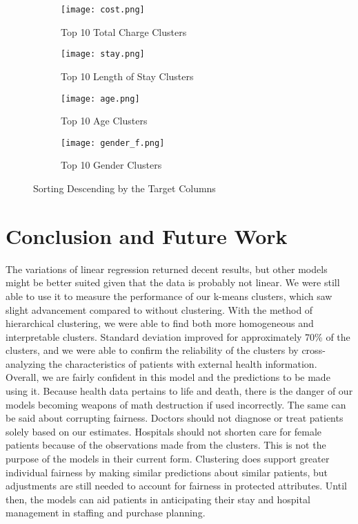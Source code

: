 \documentclass{article}
\begin{document}
\begin{figure}[H]
         \centering
         \centering
     \begin{subfigure}[b]{0.4\textwidth}
         \centering
         \texttt{[image: cost.png]}
         \caption{Top 10 Total Charge Clusters}
         \label{fig:y equals x}
     \end{subfigure}
     \begin{subfigure}[b]{0.4\textwidth}
         \centering
         \texttt{[image: stay.png]}
         \caption{Top 10 Length of Stay Clusters}
         \label{fig:three sin x}
     \end{subfigure}
     \begin{subfigure}[b]{0.4\textwidth}
         \centering
         \texttt{[image: age.png]}
         \caption{Top 10 Age Clusters}
         \label{fig:three sin x}
     \end{subfigure}
     \begin{subfigure}[b]{0.4\textwidth}
         \centering
         \texttt{[image: gender\_f.png]}
         \caption{Top 10 Gender Clusters}
         \label{fig:three sin x}
     \end{subfigure}
     \caption{Sorting Descending by the Target Columns}
\end{figure}
\noindent
\newline

\section{Conclusion and Future Work}
The variations of linear regression returned decent results, but other models might be better suited given that the data is probably not linear. We were still able to use it to measure the performance of our k-means clusters, which saw slight advancement compared to without clustering. With the method of hierarchical clustering, we were able to find both more homogeneous and interpretable clusters. Standard deviation improved for approximately 70\% of the clusters, and we were able to confirm the reliability of the clusters by cross-analyzing the characteristics of patients with external health information. Overall, we are fairly confident in this model and the predictions to be made using it.
\newline
\newline
Because health data pertains to life and death, there is the danger of our models becoming weapons of math destruction if used incorrectly. The same can be said about corrupting fairness. Doctors should not diagnose or treat patients solely based on our estimates. Hospitals should not shorten care for female patients because of the observations made from the clusters. This is not the purpose of the models in their current form. Clustering does support greater individual fairness by making similar predictions about similar patients, but adjustments are still needed to account for fairness in protected attributes. Until then, the models can aid patients in anticipating their stay and hospital management in staffing and purchase planning.
\end{document}
